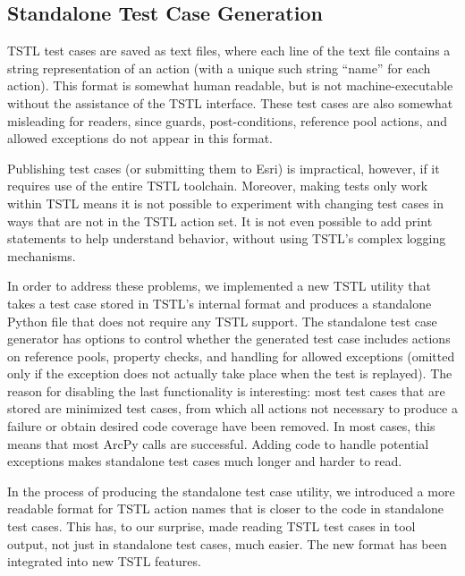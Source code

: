 \subsection{Standalone Test Case Generation}

TSTL test cases are saved as text files, where each line of the text
file contains a string representation of an action (with a unique
such string ``name'' for each action).  This format is somewhat human
readable, but is not machine-executable without the assistance of the
TSTL interface.  These test cases are also somewhat misleading for
readers, since guards, post-conditions, reference pool actions, and
allowed exceptions do not appear in this format.

Publishing test cases (or submitting them to Esri) is impractical,
however, if it requires use of the entire TSTL toolchain.  Moreover,
making tests only work within TSTL means it is not possible to
experiment with changing test cases in ways that are not in the TSTL
action set.  It is not  even possible to add print statements to help understand
behavior, without using TSTL's complex logging mechanisms.  

In order to address these problems, we implemented a new TSTL utility
that takes a test case stored in TSTL's internal format and produces a
standalone Python file that does not require any TSTL support.  The
standalone test case generator has options to control whether the
generated test case includes actions on reference pools, property
checks, and handling for allowed exceptions (omitted only if the exception does not
actually take place when the test is replayed).  The reason for disabling
the last functionality is interesting:  most test cases that are
stored are minimized \cite{DD} test cases, from which all actions not
necessary to produce a failure or obtain desired code coverage have
been removed.  In most cases, this means that most ArcPy calls are
successful.  Adding code to handle potential exceptions makes
standalone test cases much longer and harder to read.

In the process of producing the standalone test case utility, we
introduced a more readable format for TSTL action names that is closer
to the code in standalone test cases.  This has, to our surprise, made
reading TSTL test cases in tool output, not just in standalone test
cases, much easier.  The new format has been integrated into new TSTL features.